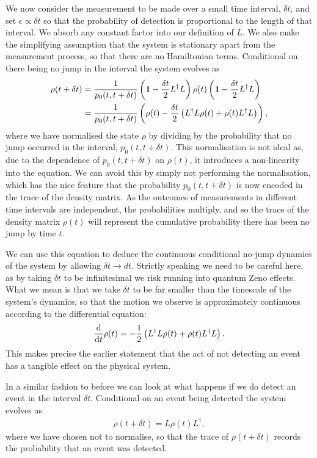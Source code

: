 We now consider the measurement to be made over a small time interval, $\delta t$, and set $\epsilon \propto \delta t$ so that the probability of detection is proportional to the length of that interval. We absorb any constant factor into our definition of $L$. We also make the simplifying assumption that the system is stationary apart from the measurement process, so that there are no Hamiltonian terms. Conditional on there being no jump in the interval the system evolves as
\begin{align}
  \rho(t+\delta t) &= \frac{1}{p_0(t, t+\delta t)}\left(\mathbf{1} - \frac{\delta t}{2} L^\dagger L\right)\rho(t)\left(\mathbf{1} - \frac{\delta t}{2} L^\dagger L\right) \\
  &= \frac{1}{p_0(t, t+\delta t)}\left(\rho(t) - \frac{\delta t}{2} \left(L^\dagger L \rho(t) + \rho(t) L^\dagger L \right)\right),
\end{align}
where we have normalised the state $\rho$ by dividing by the probability that no jump occurred in the interval, $p_0(t, t+\delta t)$. This normalisation is not ideal as, due to the dependence of $p_0(t, t+\delta t)$ on $\rho(t)$, it introduces a non-linearity into the equation. We can avoid this by simply not performing the normalisation, which has the nice feature that the probability $p_0(t, t+\delta t)$ is now encoded in the trace of the density matrix. As the outcomes of measurements in different time intervals are independent, the probabilities multiply, and so the trace of the density matrix $\rho(t)$ will represent the cumulative probability there has been no jump by time $t$.

We can use this equation to deduce the continuous conditional no-jump dynamics of the system by allowing $\delta t \rightarrow dt$. Strictly speaking we need to be careful here, as by taking $\delta t$ to be infinitesimal we risk running into quantum Zeno effects. What we mean is that we take $\delta t$ to be far smaller than the timescale of the system's dynamics, so that the motion we observe is approximately continuous according to the differential equation:
\begin{align}
  \frac{\mathrm{d}}{\mathrm{d}t} \rho(t) = - \frac{1}{2} \left(L^\dagger L \rho(t) + \rho(t) L^\dagger L \right).
\end{align}
This makes precise the earlier statement that the act of not detecting an event has a tangible effect on the physical system.

In a similar fashion to before we can look at what happens if we do detect an event in the interval $\delta t$. Conditional on an event being detected the system evolves as
\begin{align}
  \rho(t + \delta t) = L\rho(t)L^\dagger,
\end{align}
where we have chosen not to normalise, so that the trace of $\rho(t + \delta t)$ records the probability that an event was detected.

